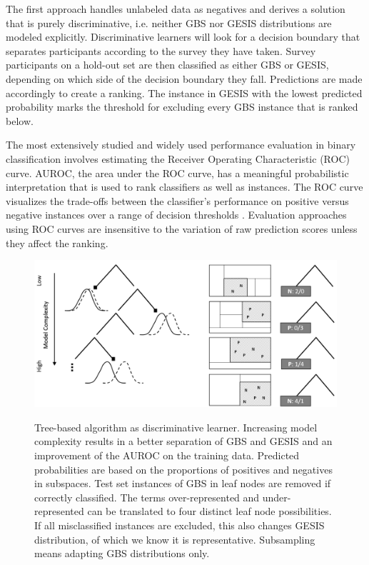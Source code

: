 The first approach handles unlabeled data as negatives and derives a solution that is purely discriminative, i.e. neither GBS nor GESIS distributions are modeled explicitly. Discriminative learners will look for a decision boundary that separates participants according to the survey they have taken. Survey participants on a hold-out set are then classified as either GBS or GESIS, depending on which side of the decision boundary they fall. Predictions are made accordingly to create a ranking. The instance in GESIS with the lowest predicted probability marks the threshold for excluding every GBS instance that is ranked below.

The most extensively studied and widely used performance evaluation in binary classification involves estimating the Receiver Operating Characteristic (ROC) curve. AUROC, the area under the ROC curve, has a meaningful probabilistic interpretation that is used to rank classifiers as well as instances. The ROC curve visualizes the trade-offs between the classifier's performance on positive versus negative instances over a range of decision thresholds \cite{roc}. Evaluation approaches using ROC curves are insensitive to the variation of raw prediction scores unless they affect the ranking.

\vspace{1cm}
\begin{figure}[ht]
	\begin{center}
		\captionsetup{width= 380pt}
		\includegraphics[scale=0.32,angle=0]{fig/tree}
		\label{project}
		\caption{Tree-based algorithm as discriminative learner. Increasing model complexity results in a better separation of GBS and GESIS and an improvement of the AUROC on the training data. Predicted probabilities are based on the proportions of positives and negatives in subspaces. Test set instances of GBS in leaf nodes are removed if correctly classified. The terms over-represented and under-represented can be translated to four distinct leaf node possibilities. If all misclassified instances are excluded, this also changes GESIS distribution, of which we know it is representative. Subsampling means adapting GBS distributions only.}
	\end{center}
\end{figure}

